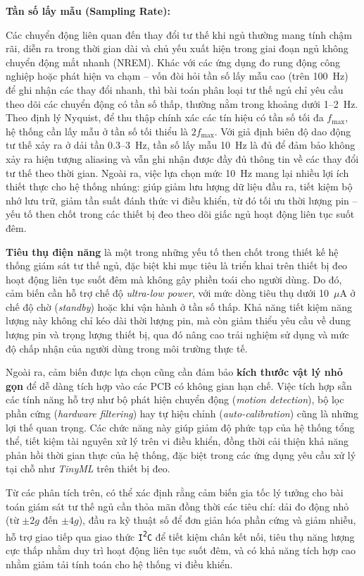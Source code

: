 \textbf{Tần số lấy mẫu (Sampling Rate):}

Các chuyển động liên quan đến thay đổi tư thế khi ngủ thường mang tính chậm rãi, diễn ra trong thời gian dài và chủ yếu xuất hiện trong giai đoạn ngủ không chuyển động mắt nhanh (NREM). Khác với các ứng dụng đo rung động công nghiệp hoặc phát hiện va chạm – vốn đòi hỏi tần số lấy mẫu cao (trên 100~Hz) để ghi nhận các thay đổi nhanh, thì bài toán phân loại tư thế ngủ chỉ yêu cầu theo dõi các chuyển động có tần số thấp, thường nằm trong khoảng dưới 1–2~Hz.
Theo định lý Nyquist, để thu thập chính xác các tín hiệu có tần số tối đa $f_\mathrm{max}$, hệ thống cần lấy mẫu ở tần số tối thiểu là $2f_\mathrm{max}$. Với giả định biên độ dao động tư thế xảy ra ở dải tần 0.3–3~Hz, tần số lấy mẫu 10~Hz là đủ để đảm bảo không xảy ra hiện tượng aliasing và vẫn ghi nhận được đầy đủ thông tin về các thay đổi tư thế theo thời gian.
Ngoài ra, việc lựa chọn mức 10~Hz mang lại nhiều lợi ích thiết thực cho hệ thống nhúng: giúp giảm lưu lượng dữ liệu đầu ra, tiết kiệm bộ nhớ lưu trữ, giảm tần suất đánh thức vi điều khiển, từ đó tối ưu thời lượng pin – yếu tố then chốt trong các thiết bị đeo theo dõi giấc ngủ hoạt động liên tục suốt đêm. 

\textbf{Tiêu thụ điện năng} là một trong những yếu tố then chốt trong thiết kế hệ thống giám sát tư thế ngủ, đặc biệt khi mục tiêu là triển khai trên thiết bị đeo hoạt động liên tục suốt đêm mà không gây phiền toái cho người dùng. Do đó, cảm biến cần hỗ trợ chế độ \textit{ultra-low power}, với mức dòng tiêu thụ dưới 10~$\mu$A ở chế độ chờ (\textit{standby}) hoặc khi vận hành ở tần số thấp. Khả năng tiết kiệm năng lượng này không chỉ kéo dài thời lượng pin, mà còn giảm thiểu yêu cầu về dung lượng pin và trọng lượng thiết bị, qua đó nâng cao trải nghiệm sử dụng và mức độ chấp nhận của người dùng trong môi trường thực tế.

Ngoài ra, cảm biến được lựa chọn cũng cần đảm bảo \textbf{kích thước vật lý nhỏ gọn} để dễ dàng tích hợp vào các PCB có không gian hạn chế. Việc tích hợp sẵn các tính năng hỗ trợ như bộ phát hiện chuyển động (\textit{motion detection}), bộ lọc phần cứng (\textit{hardware filtering}) hay tự hiệu chỉnh (\textit{auto-calibration}) cũng là những lợi thế quan trọng. Các chức năng này giúp giảm độ phức tạp của hệ thống tổng thể, tiết kiệm tài nguyên xử lý trên vi điều khiển, đồng thời cải thiện khả năng phản hồi thời gian thực của hệ thống, đặc biệt trong các ứng dụng yêu cầu xử lý tại chỗ như \textit{TinyML} trên thiết bị đeo.

Từ các phân tích trên, có thể xác định rằng cảm biến gia tốc lý tưởng 
cho bài toán giám sát tư thế ngủ cần thỏa mãn đồng thời các 
tiêu chí: dải đo động nhỏ (từ $\pm2g$ đến $\pm4g$), đầu ra kỹ thuật số để đơn giản hóa phần cứng và giảm nhiễu, hỗ trợ giao tiếp qua giao thức \texttt{I\textsuperscript{2}C} để tiết kiệm chân kết nối, tiêu thụ năng lượng cực thấp nhằm duy trì hoạt động liên tục suốt đêm, và có khả năng tích hợp cao nhằm giảm tải tính toán cho hệ thống vi điều khiển.

